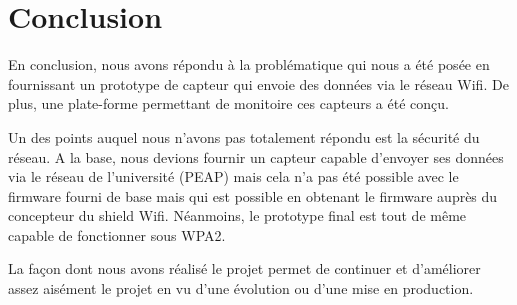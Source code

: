 	\section*{Conclusion}
		\par
		En conclusion, nous avons répondu à la problématique qui nous a été posée en fournissant un prototype de capteur qui envoie des données via le réseau Wifi. De plus, une plate-forme permettant de monitoire ces capteurs a été conçu.
		\par
		Un des points auquel nous n'avons pas totalement répondu est la sécurité du réseau. A la base, nous devions fournir un capteur capable d'envoyer ses données via le réseau de l'université (PEAP) mais cela n'a pas été possible avec le firmware fourni de base mais qui est possible en obtenant le firmware auprès du concepteur du shield Wifi. Néanmoins, le prototype final est tout de même capable de fonctionner sous WPA2.
		\par
		La façon dont nous avons réalisé le projet permet de continuer et d'améliorer assez aisément le projet en vu d'une évolution ou d'une mise en production.

